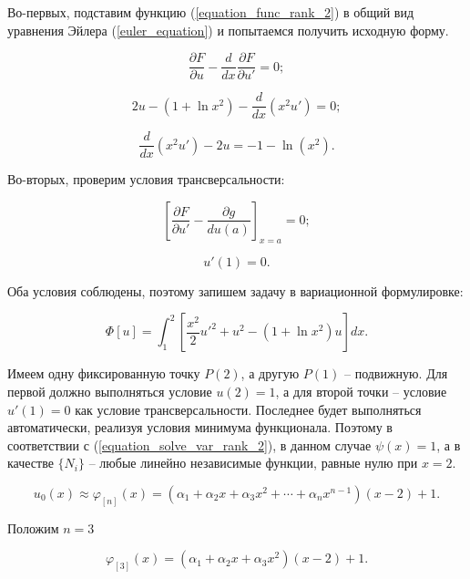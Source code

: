 \documentclass{article}
\begin{document}
Во-первых, подставим функцию (\ref{equation_func_rank_2}) в общий вид уравнения Эйлера (\ref{euler_equation}) и попытаемся получить исходную форму.

\begin{displaymath}
	\frac{\partial F}{\partial u} - \frac{d}{dx}\frac{\partial F}{\partial u'} = 0;
\end{displaymath}

\begin{displaymath}
	2u - (1 + \ln{x^2}) - \frac{d}{dx}(x^2 u') = 0;
\end{displaymath}

\begin{displaymath}
	\frac{d}{dx}(x^2 u') - 2u = -1 - \ln(x^2).
\end{displaymath}

\noindent Во-вторых, проверим условия трансверсальности:

\begin{displaymath}
	\left[ \frac{\partial F}{\partial u'} - \frac{\partial g}{du(a)} \right]_{x=a} = 0;
\end{displaymath}

\begin{displaymath}
	u'(1) = 0.
\end{displaymath}

\noindent Оба условия соблюдены, поэтому запишем задачу в вариационной формулировке:

\begin{equation}\label{equation_functional_rank_2}
	\Phi[u] = \int_{1}^{2} \left[ \frac{x^2}{2}u'^2 + u^2 - (1 + \ln{x^2})u \right] dx.
\end{equation}

Имеем одну фиксированную точку $P(2)$, а другую $P(1)$ -- подвижную. Для первой должно выполняться условие $u(2)=1$, а для второй точки -- условие $u'(1)=0$ как условие трансверсальности. Последнее будет выполняться автоматически, реализуя условия минимума функционала. Поэтому в соответствии с (\ref{equation_solve_var_rank_2}), в данном случае $\psi(x) = 1$, а в качестве $\lbrace N_{i} \rbrace$ -- любые линейно независимые функции, равные нулю при $x=2$.

\begin{displaymath}
	u_{0}(x) \approx \varphi_{[n]}(x) = (\alpha_{1} + \alpha_{2}x + \alpha_{3}x^2 + \cdots + \alpha_{n}x^{n-1})(x-2)+1.
\end{displaymath}

\noindent Положим $n = 3$

\begin{displaymath}
	\varphi_{[3]}(x) = (\alpha_{1} + \alpha_{2}x + \alpha_{3}x^2)(x-2)+1.
\end{displaymath}
\end{document}
